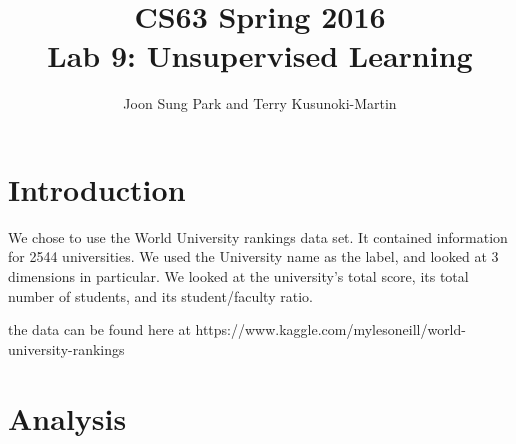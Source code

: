 \documentclass[11pt]{article}
\title{CS63 Spring 2016\\Lab 9: Unsupervised Learning}
\author{Joon Sung Park and Terry Kusunoki-Martin}
\begin{document}
\maketitle

\section{Introduction}

We chose to use the World University rankings data set.  It contained information for 2544 universities.  We used the University name as the label, and looked at 3 dimensions in particular.  We looked at the university's total score, its total number of students, and its student/faculty ratio.  

the data can be found here at https://www.kaggle.com/mylesoneill/world-university-rankings

\section{Analysis}
\end{document}
